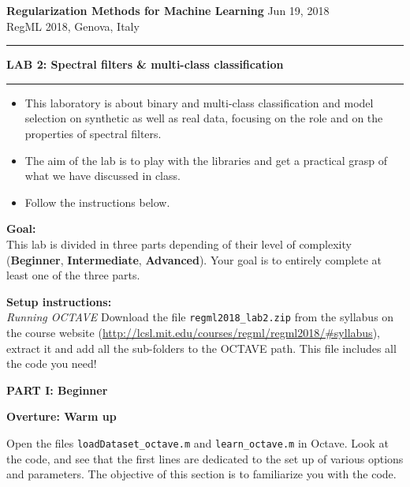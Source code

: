 \documentclass[DIN, pagenumber=false, fontsize=11pt, parskip=half]{scrartcl}
\newcommand{\mytitle}[1]{{\noindent\LARGE\textbf{#1}}}
\newcommand{\mysection}[1]{\noindent\large\textbf{#1}}
\begin{document}
\noindent\textbf{Regularization Methods for Machine Learning} \hfill Jun 19, 2018\\
RegML 2018, Genova, Italy\\ \rule{\textwidth}{1pt}

\mytitle{\center LAB 2: Spectral filters \& multi-class classification}\\
\rule{\textwidth}{1pt}
\begin{itemize}\itemsep1pt \parskip0pt 
  \item This laboratory is about binary and multi-class classification and model selection on synthetic as well as real data, focusing on the role and on the properties of spectral filters.
  \item The aim of the lab is to play with the libraries and get a practical grasp of what we have discussed in class.
  \item Follow the instructions below.  
\end{itemize}

\begin{framed}
\textbf{\textbf{Goal}:} \\
This lab is divided in three parts depending of their level of complexity (\textbf{Beginner}, \textbf{Intermediate}, \textbf{Advanced}). Your goal is to entirely complete at least one of the three parts.
\end{framed}

\begin{framed}
\textbf{\textbf{Setup instructions}:} \\
\textit{Running OCTAVE}
 Download the file \texttt{regml2018\_lab2.zip} from the syllabus on the course website (\url{http://lcsl.mit.edu/courses/regml/regml2018/\#syllabus}), extract it and add all the sub-folders to the OCTAVE path. This file includes all the code you need!
\end{framed}

\pagebreak
\begin{center}
\large\textbf{PART I: Beginner}
\end{center}

\mysection{Overture: Warm up}

\noindent Open the files \texttt{loadDataset\_octave.m} and \texttt{learn\_octave.m} in Octave.
Look at the code, and see that the first lines are dedicated to the set up of various options and parameters.
The objective of this section is to familiarize you with the code.
\end{document}
